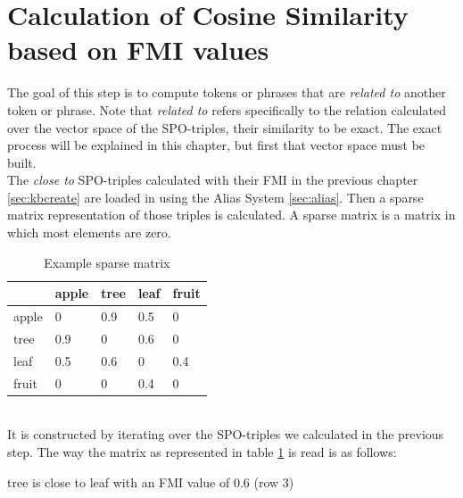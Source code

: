 \section{Calculation of Cosine Similarity based on FMI values}
\label{sec:kbcompute}
The goal of this step is to compute tokens or phrases that are \textit{related to} another token or phrase. Note that \textit{related to} refers specifically to the relation calculated over the vector space of the SPO-triples, their similarity to be exact. The exact process will be explained in this chapter, but first that vector space must be built.\\
The \textit{close to} SPO-triples calculated with their FMI in the previous chapter \ref{sec:kbcreate} are loaded in using the Alias System \ref{sec:alias}. Then a sparse matrix representation of those triples is calculated. A sparse matrix is a matrix in which most elements are zero.\\
\begin{table}[h!]
\centering
\caption{Example sparse matrix}
\label{table:sparse}
\begin{tabular}{l|l|l|l|l}
 & apple & tree & leaf & fruit\\ \hline
apple & 0 & 0.9 & 0.5 & 0 \\ \hline
tree & 0.9 & 0 & 0.6 & 0\\ \hline
leaf & 0.5 & 0.6 & 0 & 0.4 \\ \hline
fruit & 0 & 0 & 0.4 & 0\\ 
\end{tabular}
\end{table}\\

It is constructed by iterating over the SPO-triples we calculated in the previous step. The way the matrix as represented in table \ref{table:sparse} is read is as follows:\\
\centerline{tree is close to leaf with an FMI value of 0.6 (row 3)}\\


